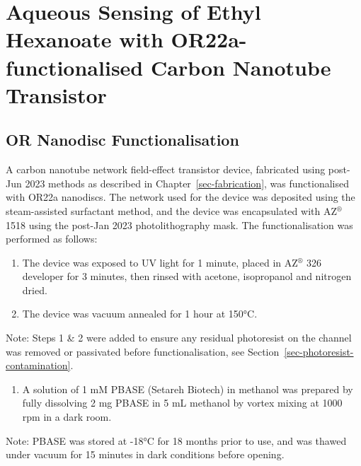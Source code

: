 \documentclass[
  a4paper,
]{scrbook}
\providecommand{\tightlist}{%
  \setlength{\itemsep}{0pt}\setlength{\parskip}{0pt}}\usepackage{longtable,booktabs,array}
\begin{document}
\hypertarget{sec-aqueous-sensing-EtHex}{%
\section{Aqueous Sensing of Ethyl Hexanoate with OR22a-functionalised
Carbon Nanotube Transistor}\label{sec-aqueous-sensing-EtHex}}

\hypertarget{sec-working-PBASE-functionalisation}{%
\subsection{OR Nanodisc
Functionalisation}\label{sec-working-PBASE-functionalisation}}

A carbon nanotube network field-effect transistor device, fabricated
using post-Jun 2023 methods as described in
Chapter~\ref{sec-fabrication}, was functionalised with OR22a nanodiscs.
The network used for the device was deposited using the steam-assisted
surfactant method, and the device was encapsulated with AZ\(^\circledR\)
1518 using the post-Jan 2023 photolithography mask. The
functionalisation was performed as follows:

\begin{enumerate}
\def\labelenumi{\arabic{enumi}.}
\item
  The device was exposed to UV light for 1 minute, placed in
  AZ\(^\circledR\) 326 developer for 3 minutes, then rinsed with
  acetone, isopropanol and nitrogen dried.
\item
  The device was vacuum annealed for 1 hour at 150°C.
\end{enumerate}

Note: Steps 1 \& 2 were added to ensure any residual photoresist on the
channel was removed or passivated before functionalisation, see
Section~\ref{sec-photoresist-contamination}.

\begin{enumerate}
\def\labelenumi{\arabic{enumi}.}
\setcounter{enumi}{2}
\tightlist
\item
  A solution of 1 mM PBASE (Setareh Biotech) in methanol was prepared by
  fully dissolving 2 mg PBASE in 5 mL methanol by vortex mixing at 1000
  rpm in a dark room.
\end{enumerate}

Note: PBASE was stored at -18°C for 18 months prior to use, and was
thawed under vacuum for 15 minutes in dark conditions before opening.
\end{document}

